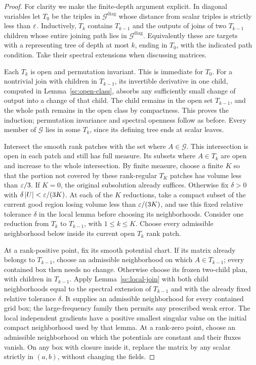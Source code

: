 \begin{proof}
For clarity we make the finite-depth argument explicit. In diagonal
variables let $T_0$ be the triples in $\mathcal G^{\mathrm{diag}}$
whose distance from scalar triples is strictly less than $\varepsilon$.
Inductively, $T_k$ contains $T_{k-1}$ and the outputs of joins of
two $T_{k-1}$ children whose entire joining path lies in
$\mathcal G^{\mathrm{diag}}$. Equivalently these are targets
with a representing tree of depth at most $k$, ending in $T_0$,
with the indicated path condition. Take their spectral extensions
when discussing matrices.

Each $T_k$ is open and permutation invariant. This is immediate
for $T_0$. For a nontrivial join with children in $T_{k-1}$, its
invertible derivative in one child, computed in
Lemma~\ref{sc:open-class}, absorbs any sufficiently small change
of output into a change of that child. The child remains in the
open set $T_{k-1}$, and the whole path remains in the open class
by compactness. This proves the induction; permutation invariance
and spectral openness follow as before. Every member of
$\mathcal G$ lies in some $T_k$, since its defining tree ends
at scalar leaves.

Intersect the smooth rank patches with the set where $A\in\mathcal G$.
This intersection is open in each patch and still has full measure.
Its subsets where $A\in T_k$ are open and increase to the whole
intersection. By finite measure, choose a finite $K$ so that the portion
not covered by these rank-regular $T_K$ patches has volume less than
$\varepsilon/3$. If $K=0$, the original subsolution already suffices. Otherwise
fix $\delta>0$ with $\delta\left\lvert U\right\rvert<\varepsilon/(3K)$. At each of the $K$
reductions, take a compact subset of the current good region losing
volume less than $\varepsilon/(3K)$, and use this fixed relative tolerance
$\delta$ in the local lemma before choosing its neighborhoods.
Consider one reduction from $T_k$ to $T_{k-1}$, with $1\leq k\leq K$.
Choose every admissible neighborhood below inside its current open
$T_k$ rank patch.

At a rank-positive point, fix its smooth potential chart. If its
matrix already belongs to $T_{k-1}$, choose an admissible neighborhood
on which $A\in T_{k-1}$; every contained box then needs no change.
Otherwise choose its frozen two-child
plan, with children in $T_{k-1}$. Apply Lemma~\ref{sc:local-join}
with both child neighborhoods equal to the spectral extension of
$T_{k-1}$ and with the already fixed relative tolerance $\delta$.
It supplies an admissible neighborhood for every contained grid box;
the large-frequency family then permits any prescribed weak error.
The local independent gradients
have a positive smallest singular value on the initial compact
neighborhood used by that lemma. At a rank-zero point, choose an
admissible neighborhood on which the potentials are constant and their
fluxes vanish. On any box with closure inside it, replace the matrix by
any scalar strictly in $(a,b)$, without changing the fields.


\end{proof}
